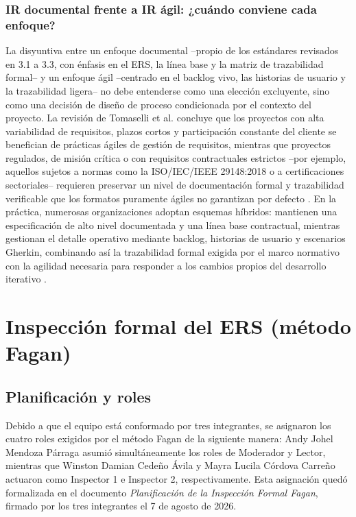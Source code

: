 \documentclass[journal,onecolumn]{IEEEtran}
\begin{document}
	\subsubsection{IR documental frente a IR ágil: ¿cuándo conviene cada enfoque?}
	
	La disyuntiva entre un enfoque documental --propio de los estándares revisados en 3.1 a 3.3, con énfasis en el ERS, la línea base y la matriz de trazabilidad formal-- y un enfoque ágil --centrado en el backlog vivo, las historias de usuario y la trazabilidad ligera-- no debe entenderse como una elección excluyente, sino como una decisión de diseño de proceso condicionada por el contexto del proyecto. La revisión de Tomaselli et al. \cite{Tomaselli2025} concluye que los proyectos con alta variabilidad de requisitos, plazos cortos y participación constante del cliente se benefician de prácticas ágiles de gestión de requisitos, mientras que proyectos regulados, de misión crítica o con requisitos contractuales estrictos --por ejemplo, aquellos sujetos a normas como la ISO/IEC/IEEE 29148:2018 o a certificaciones sectoriales-- requieren preservar un nivel de documentación formal y trazabilidad verificable que los formatos puramente ágiles no garantizan por defecto \cite{ISO29148-2018}. En la práctica, numerosas organizaciones adoptan esquemas híbridos: mantienen una especificación de alto nivel documentada y una línea base contractual, mientras gestionan el detalle operativo mediante backlog, historias de usuario y escenarios Gherkin, combinando así la trazabilidad formal exigida por el marco normativo con la agilidad necesaria para responder a los cambios propios del desarrollo iterativo \cite{Tomaselli2025, LohMunKeong2022}.
	\newpage
	\section{Inspección formal del ERS (método Fagan)}
	
	\subsection{Planificación y roles}
	
	Debido a que el equipo está conformado por tres integrantes, se asignaron los cuatro roles exigidos por el método Fagan de la siguiente manera: Andy Johel Mendoza Párraga asumió simultáneamente los roles de Moderador y Lector, mientras que Winston Damian Cedeño Ávila y Mayra Lucila Córdova Carreño actuaron como Inspector 1 e Inspector 2, respectivamente. Esta asignación quedó formalizada en el documento \textit{Planificación de la Inspección Formal Fagan}, firmado por los tres integrantes el 7 de agosto de 2026.
	
\end{document}

